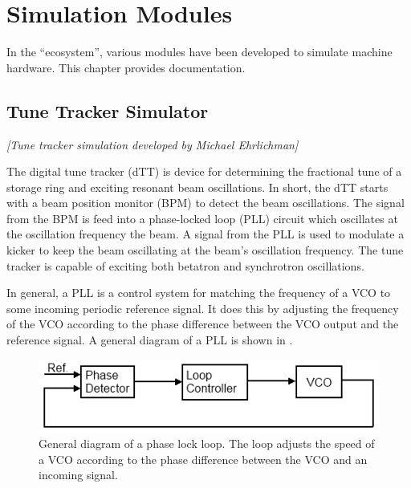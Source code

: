 \chapter{Simulation Modules}

In the \bmad ``ecosystem'', various modules have been developed to
simulate machine hardware. This chapter provides documentation.

\section{Tune Tracker Simulator}

\textit{\large [Tune tracker simulation developed by Michael Ehrlichman]}

The digital tune tracker (dTT) is device for determining the
fractional tune of a storage ring and exciting resonant beam
oscillations.  In short, the dTT starts with a beam position monitor
(BPM) to detect the beam oscillations. The signal from the BPM is feed
into a phase-locked loop (PLL) circuit which oscillates at the
oscillation frequency the beam. A signal from the PLL is used to
modulate a kicker to keep the beam oscillating at the beam's
oscillation frequency. The tune tracker is capable of exciting both
betatron and synchrotron oscillations.

In general, a PLL is a control system for matching the frequency of a
VCO to some incoming periodic reference signal.  It does this by
adjusting the frequency of the VCO according to the phase difference
between the VCO output and the reference signal.  A general diagram of
a PLL is shown in .

  \begin{figure}[ht]
  \centering
  \includegraphics{PLL.png}
  \caption[General diagram of a phase lock loop.]{
General diagram of a phase lock loop. The loop adjusts the speed of a
VCO according to the phase difference between the VCO and an incoming
signal.}
  \label{f:PLL}
  \end{figure}

